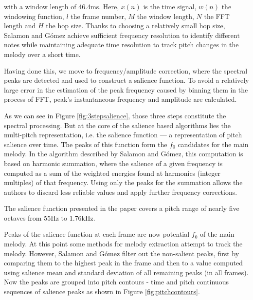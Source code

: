 with a window length of 46.4ms. Here, $x(n)$ is the time signal, $w(n)$ the windowing function, $l$ the frame number, $M$ the window length, $N$ the FFT length and $H$ the hop size. Thanks to choosing a relatively small hop size, Salamon and G\'{o}mez achieve sufficient frequency resolution to identify different notes while maintaining adequate time resolution to track pitch changes in the melody over a short time. 

Having done this, we move to frequency/amplitude correction, where the spectral peaks are detected and used to construct a salience function. To avoid a relatively large error in the estimation of the peak frequency caused by binning them in the process of FFT, peak’s instantaneous frequency and amplitude are calculated. 

As we can see in Figure \ref{fig:3stepsalience}, those three steps constitute the spectral processing. But at the core of the salience based algorithms lies the multi-pitch representation, i.e. the salience function — a representation of pitch salience over time. The peaks of this function form the $f_{0}$ candidates for the main melody. In the algorithm described by Salamon and G\'{o}mez, this computation is based on harmonic summation, where the salience of  a given frequency is computed as a sum of the weighted energies found at harmonics (integer multiples) of that frequency. Using only the peaks for the summation allows the authors to discard less reliable values and apply further frequency corrections. 

The salience function presented in the paper covers a pitch range of nearly five octaves from 55Hz to 1.76kHz.

Peaks of the salience function at each frame are now potential $f_{0}$ of the main melody. At this point some methods for melody extraction attempt to track the melody. However, Salamon and G\'{o}mez filter out the non-salient peaks, first by comparing them to the highest peak in the frame and then to a value computed using salience mean and standard deviation of all remaining peaks (in all frames). Now the peaks are grouped into pitch contours - time and pitch continuous sequences of salience peaks as shown in Figure \ref{fig:pitchcontours}.


